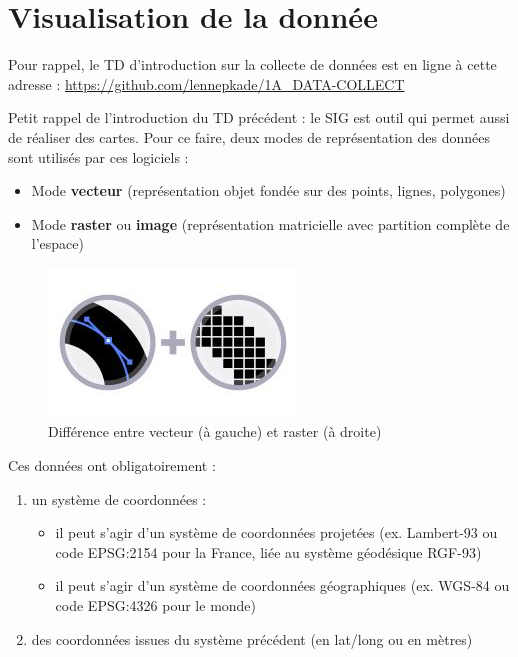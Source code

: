 \hypertarget{visualisation-de-la-donnuxe9e}{%
\section{Visualisation de la
donnée}\label{visualisation-de-la-donnuxe9e}}

Pour rappel, le TD d'introduction sur la collecte de données est en
ligne à cette adresse :
\url{https://github.com/lennepkade/1A_DATA-COLLECT}

Petit rappel de l'introduction du TD précédent : le SIG est outil qui
permet aussi de réaliser des cartes. Pour ce faire, deux modes de
représentation des données sont utilisés par ces logiciels :

\begin{itemize}
\tightlist
\item
  Mode \textbf{vecteur} (représentation objet fondée sur des points,
  lignes, polygones)
\item
  Mode \textbf{raster} ou \textbf{image} (représentation matricielle
  avec partition complète de l'espace)
\end{itemize}

\begin{figure}
\centering
\includegraphics{figures/icon_vector-raster.jpg}
\caption{Différence entre vecteur (à gauche) et raster (à droite)}
\end{figure}

Ces données ont obligatoirement :

\begin{enumerate}
\def\labelenumi{\arabic{enumi}.}
\tightlist
\item
  un système de coordonnées :

  \begin{itemize}
  \tightlist
  \item
    il peut s'agir d'un système de coordonnées projetées (ex. Lambert-93
    ou code EPSG:2154 pour la France, liée au système géodésique RGF-93)
  \item
    il peut s'agir d'un système de coordonnées géographiques (ex. WGS-84
    ou code EPSG:4326 pour le monde)
  \end{itemize}
\item
  des coordonnées issues du système précédent (en lat/long ou en mètres)
\end{enumerate}

